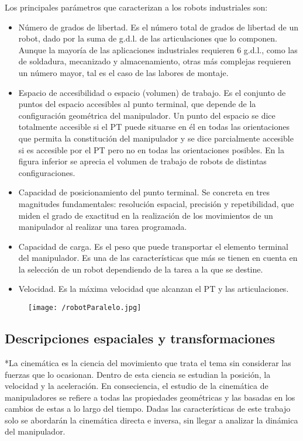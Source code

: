 \documentclass[a4paper, openright, 12pt]{report}
\begin{document}
Los principales parámetros que caracterizan a los robots industriales son:

	\begin{itemize}
		\item{Número de grados de libertad. Es el número total de grados de libertad de un robot, dado por la suma de g.d.l. de las articulaciones que lo componen. Aunque la mayoría de las aplicaciones industriales requieren 6 g.d.l., como las de soldadura, mecanizado y almacenamiento, otras más complejas requieren un número mayor, tal es el caso de las labores de montaje.}

		\item{Espacio de accesibilidad o espacio (volumen) de trabajo. Es el conjunto de puntos del espacio accesibles al punto terminal, que depende de la configuración geométrica del manipulador. Un punto del espacio se dice totalmente accesible si el PT puede situarse en él en todas las orientaciones que permita la constitución del manipulador y se dice parcialmente accesible si es accesible por el PT pero no en todas las orientaciones posibles. En la figura inferior se aprecia el volumen de trabajo de robots de distintas configuraciones.}

		\item{Capacidad de posicionamiento del punto terminal. Se concreta en tres magnitudes fundamentales: resolución espacial, precisión y repetibilidad, que miden el grado de exactitud en la realización de los movimientos de un manipulador al realizar una tarea programada.}

		\item{Capacidad de carga. Es el peso que puede transportar el elemento terminal del manipulador. Es una de las características que más se tienen en cuenta en la selección de un robot dependiendo de la tarea a la que se destine.}

		\item{Velocidad. Es la máxima velocidad que alcanzan el PT y las articulaciones.}
	\end{itemize}

		\begin{figure}[htb]
			\begin{center}
			\texttt{[image: /robotParalelo.jpg]}
			\end{center}
		\end{figure}


		\subsection{Descripciones espaciales y transformaciones}
			*La cinemática es la ciencia del movimiento que trata el tema sin considerar las fuerzas que lo ocasionan. Dentro de esta ciencia se estudian la posición, la velocidad y la aceleración. En conseciencia, el estudio de la cinemática de manipuladores se refiere a todas las propiedades geométricas y las basadas en los cambios de estas a lo largo del tiempo. Dadas las características de este trabajo solo se abordarán la cinemática directa e inversa, sin llegar a analizar la dinámica del manipulador.\\
\end{document}
